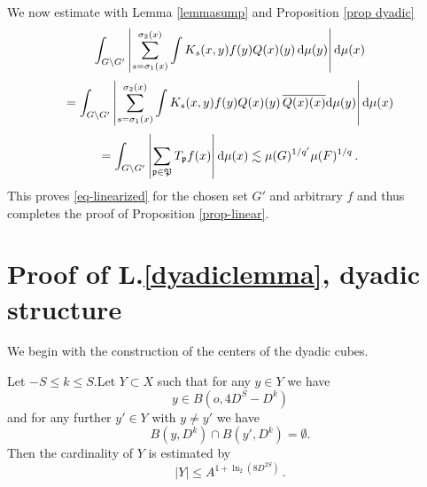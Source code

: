 We now estimate with Lemma \ref{lemmasump} and Proposition \ref{prop dyadic}
\begin{equation}
 \int_{G \setminus G'} \left|\sum_{s={\sigma_1}(x)}^{{\sigma_2}(x)} \int K_s(x,y) f(y) {Q}(x)(y)  \, \mathrm{d}\mu(y)\right| \mathrm{d}\mu(x)
\end{equation}
\begin{equation}
 =\int_{G \setminus G'} \left|\sum_{s={\sigma_1}(x)}^{{\sigma_2}(x)} \int K_s(x,y) f(y) {Q}(x)(y)  \, \overline{{Q}(x)(x)}\mathrm{d}\mu(y)\right| \mathrm{d}\mu(x)
\end{equation}
\begin{equation}
 =\int_{G \setminus G'} \left|\sum_{\mathfrak p\in \mathfrak P}T_{\mathfrak p} f(x)\right| \mathrm{d}\mu(x)
 \lesssim \mu(G)^{1/q'} \mu(F)^{1/q} \,.
\end{equation}
This proves \eqref{eq-linearized} for the chosen set $G'$ and arbitrary $f$ and thus completes the proof of Proposition
\ref{prop-linear}.



\section{Proof of L.\ref{dyadiclemma}, dyadic structure}
\label{subsecdyadic}

We begin with the construction of the centers of the dyadic cubes. 
\begin{lemma}\label{countballlemma}
Let $-S\le k\le S$.Let $Y\subset X$ such that for any $y\in Y$
we have
\begin{equation}\label{ybinb}
  y\in B(o,4D^S-D^k)
\end{equation}
and for any further $y'\in Y$ with $y\neq y'$ we have
\begin{equation} \label{eq disj yballs}
    B(y,D^k)\cap B(y',D^k)=\emptyset.
\end{equation}
Then  the cardinality of $Y$ is estimated by
\begin{equation}\label{boundY}
    |Y|\le A^{1+\ln_2(8D^{2S})}\, .
\end{equation}
\end{lemma}


